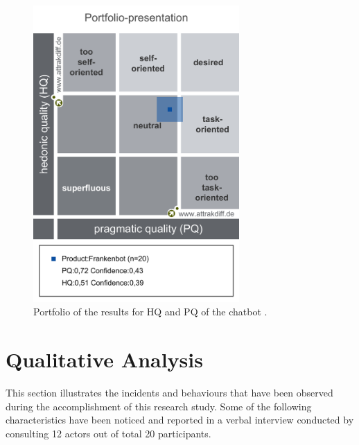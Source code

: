\begin{figure}[!h]
    \centering
    \includegraphics[width=0.7\textwidth]{img/Portfolio_of_results.png}
    \caption{Portfolio of the results for HQ and PQ of the chatbot \cite{attrakdiff}.}
    \label{fig:portRes}
\end{figure}

\section{Qualitative Analysis}
This section illustrates the incidents and behaviours that have been observed during the accomplishment of this research study. Some of the following characteristics have been noticed and reported in a verbal interview conducted by consulting 12 actors out of total 20 participants.

